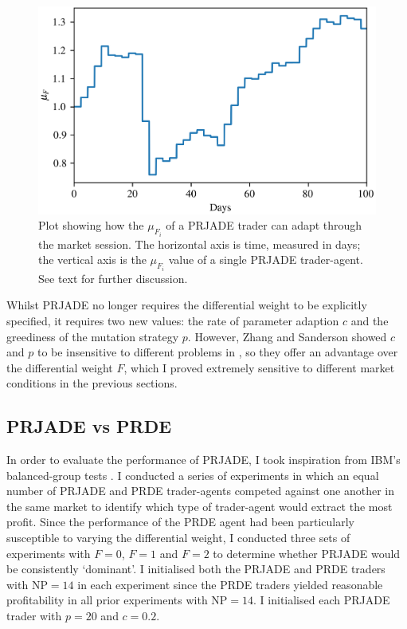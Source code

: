 \documentclass[conference]{IEEEtran}
\begin{document}
\begin{figure}[htbp]
    \centerline{\includegraphics[width=\columnwidth]{mu_F_2.0.png}}
    \caption{
        Plot showing how the $\mu_{F_i}$ of a PRJADE trader can adapt through the market session.
        The horizontal axis is time, measured in days; the vertical axis is the $\mu_{F_i}$ value of a single PRJADE trader-agent.
        See text for further discussion.
    }
    \label{mu_F}
\end{figure}

Whilst PRJADE no longer requires the differential weight to be explicitly specified, it requires two new values: the rate of parameter adaption $c$ and the greediness of the mutation strategy $p$.
However, Zhang and Sanderson showed $c$ and $p$ to be insensitive to different problems in \cite{ZhangSanderson}, so they offer an advantage over the differential weight $F$, which I proved extremely sensitive to different market conditions in the previous sections.

\subsection{PRJADE vs PRDE}

In order to evaluate the performance of PRJADE, I took inspiration from IBM's balanced-group tests \cite{TesauroDas}.
I conducted a series of experiments in which an equal number of PRJADE and PRDE trader-agents competed against one another in the same market to identify which type of trader-agent would extract the most profit.
Since the performance of the PRDE agent had been particularly susceptible to varying the differential weight, I conducted three sets of experiments with $F=0$, $F=1$ and $F=2$ to determine whether PRJADE would be consistently `dominant'.
I initialised both the PRJADE and PRDE traders with $\mathrm{NP}=14$ in each experiment since the PRDE traders yielded reasonable profitability in all prior experiments with $\mathrm{NP}=14$.
I initialised each PRJADE trader with $p=20$ and $c=0.2$.
\end{document}
